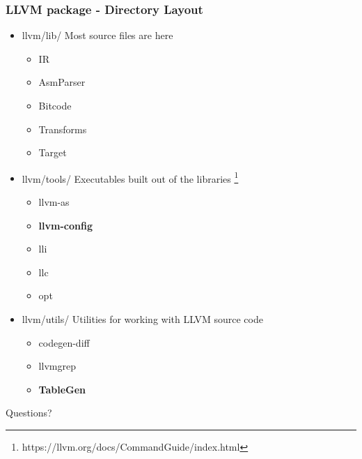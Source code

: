 \documentclass{beamer}
\begin{document}
\begin{frame}
\frametitle{LLVM package - Directory Layout}
\begin{itemize}
  \item llvm/lib/ Most source files are here
  \begin{itemize}
    \item IR
    \item AsmParser
    \item Bitcode
    \item Transforms
    \item Target
  \end{itemize}
  \item llvm/tools/ Executables built out of the libraries \footnote{https://llvm.org/docs/CommandGuide/index.html}
  \begin{itemize}
    \item llvm-as
    \item \textbf{llvm-config}
    \item lli
    \item llc
    \item opt
  \end{itemize}
  \item llvm/utils/ Utilities for working with LLVM source code
  \begin{itemize}
    \item codegen-diff
    \item llvmgrep
    \item \textbf{TableGen}
  \end{itemize}
\end{itemize}
\end{frame}

\begin{frame}
\Huge{\centerline{Questions?}}
\end{frame}
\end{document}
